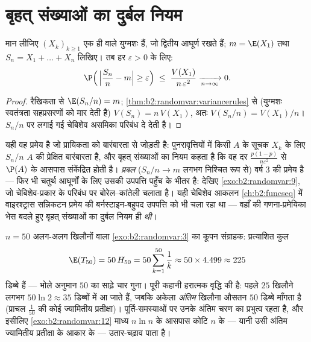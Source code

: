 \section{बृहत् संख्याओं का दुर्बल नियम}

\begin{theorem}[बृहत् संख्याओं का दुर्बल नियम]\label{thm:b2:randomvar:lln}
मान लीजिए $(X_k)_{k \geq 1}$ एक ही  वाले युग्मशः   हैं,
जो द्वितीय आघूर्ण रखते हैं; $m = \E(X_1)$ तथा $S_n = X_1 + \dots + X_n$ लिखिए। तब हर $\varepsilon > 0$ के लिए:
\[
\P\Bigl(\,\Bigl|\frac{S_n}{n} - m\Bigr| \geq \varepsilon\Bigr)
\;\leq\; \frac{V(X_1)}{n\,\varepsilon^2}
\xrightarrow[n \to \infty]{} 0 .
\]
\end{theorem}

\begin{proof}
रैखिकता से $\E(S_n/n) = m$; \cref{thm:b2:randomvar:variancerules} से (युग्मशः स्वतंत्रता सहप्रसरणों को मार देती
है) $V(S_n) = n\,V(X_1)$, अतः $V(S_n/n) =
V(X_1)/n$। $S_n/n$ पर लगाई गई चेबिशेव असमिका परिबंध दे देती है।
\end{proof}

\begin{remark}
यही वह प्रमेय है जो प्रायिकता को बारंबारता से जोड़ती है: 
पुनरावृत्तियों में किसी  $A$ के सूचक $X_k$ के लिए $S_n/n$ $A$ की
प्रेक्षित बारंबारता है, और बृहत् संख्याओं का नियम कहता है कि वह
दर $\frac{p(1-p)}{n\varepsilon^2}$ से $\P(A)$ के आसपास संकेंद्रित होती है। \emph{प्रबल}  ($S_n/n \to
m$
लगभग निश्चित रूप से) वर्ष 3 की प्रमेय है --- फिर भी चतुर्थ आघूर्णों
के लिए उसकी उपपत्ति पहुँच के भीतर है: देखिए \cref{exo:b2:randomvar:9}, जो चेबिशेव-प्रकार
के परिबंध पर बोरेल--कांतेली चलाता है। यही चेबिशेव आकलन \cref{ch:b2:funcseq} में
वाइरश्ट्रास सन्निकटन प्रमेय की बर्नस्टाइन-बहुपद उपपत्ति को भी चला
रहा था --- वहाँ की गणना-प्रमेयिका भेस बदले हुए बृहत् संख्याओं का
दुर्बल नियम ही \emph{थी}।
\end{remark}

\begin{example}
\label{ex:b2:randomvar:couponnumeric}
$n =
50$ अलग-अलग खिलौनों वाला \cref{exo:b2:randomvar:3} का कूपन संग्राहक: प्रत्याशित कुल
\[
\E(T_{50}) = 50\,H_{50} = 50\sum_{k=1}^{50}\frac1k
\approx 50 \times 4.499 \approx 225
\]
डिब्बे हैं --- भोले अनुमान $50$ का साढ़े चार गुना। पूरी कहानी
हरात्मक वृद्धि की है: पहले $25$ खिलौने लगभग $50\ln2 \approx 35$ डिब्बों में आ जाते
हैं, जबकि अकेला \emph{अंतिम} खिलौना औसतन $50$ डिब्बे माँगता है
(प्राचल $\frac1{50}$ की कोई ज्यामितीय प्रतीक्षा)। पूर्ति-समस्याओं पर उनके
अंतिम चरण का प्रभुत्व रहता है, और इसीलिए \cref{exo:b2:randomvar:12} माध्य $n\ln n$ के आसपास
कोटि $n$ के --- यानी उसी अंतिम ज्यामितीय प्रतीक्षा के आकार के ---
उतार-चढ़ाव पाता है।
\end{example}

